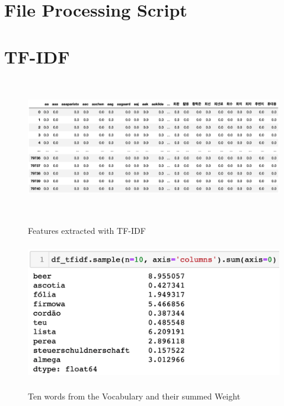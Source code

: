 \section{File Processing Script}



\section{\ac{TF-IDF}}
\label{appendix:tfidf}
\begin{figure}[]
	\centering
	\includegraphics[height=6cm]{Bilder/preprocessing/tfidf.png}
	\label{fig:tfidf}
	\caption{Features extracted with TF-IDF}
\end{figure}
\begin{figure}[]
	\centering
	\includegraphics[height=6cm]{Bilder/preprocessing/tfidf_sparse.png}
	\label{fig:tfidf_sparse}
	\caption{Ten words from the Vocabulary and their summed Weight}
\end{figure}

